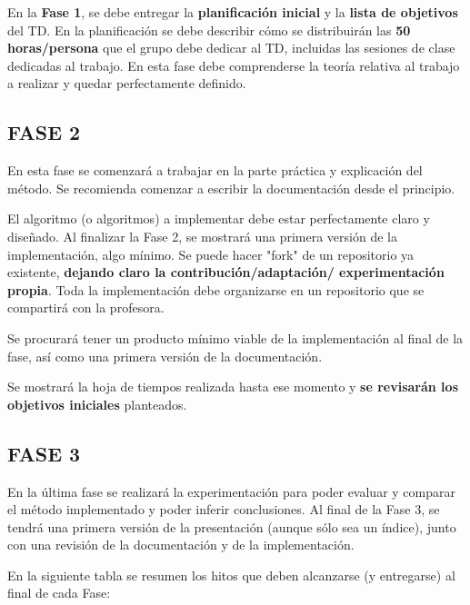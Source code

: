 \documentclass[a4paper]{article}
\begin{document}
En la \textbf{Fase 1}, se debe entregar la {\bf planificación inicial} y la {\bf lista de objetivos} del TD. En la planificación se debe describir cómo se distribuirán las {\bf 50 horas/persona} que el grupo debe dedicar al TD, incluidas las sesiones de clase dedicadas al trabajo.  
En esta fase debe comprenderse la teoría relativa al trabajo a realizar y quedar perfectamente definido. 

\subsection*{FASE 2}
En esta fase se comenzará a trabajar en la parte práctica y explicación del método. Se recomienda comenzar a escribir la documentación desde el principio.

El algoritmo (o algoritmos) a implementar debe estar perfectamente claro y diseñado. Al finalizar la Fase 2, se mostrará una primera versión de la implementación, algo mínimo. Se puede hacer "fork" de un repositorio ya existente, {\bf dejando claro la contribución/adaptación/ experimentación propia}. Toda la implementación debe organizarse en un repositorio que se compartirá con la profesora.

Se procurará tener un producto mínimo viable de la implementación al final de la fase, así como una primera versión de la documentación. 

 Se mostrará la hoja de tiempos realizada hasta ese momento y \textbf{se revisarán los objetivos iniciales} planteados.

\subsection*{FASE 3}

En la última fase se realizará la experimentación para poder evaluar y comparar el método implementado y poder inferir conclusiones. Al final de la Fase 3, se tendrá una primera versión de la presentación (aunque sólo sea un índice), junto con una revisión de la documentación y de la implementación. 

\vspace{1cm}
En la siguiente tabla se resumen los hitos que deben alcanzarse (y entregarse) al final de cada Fase: 
\end{document}
